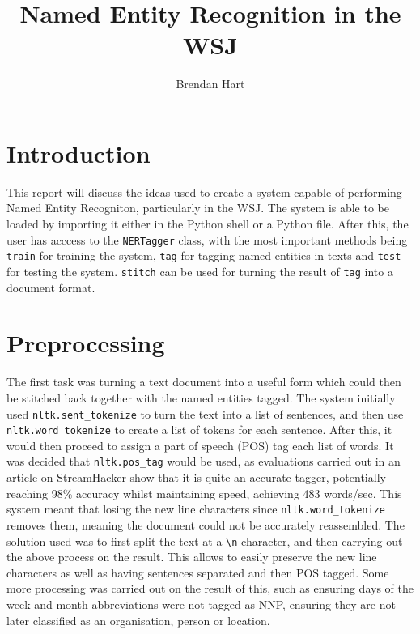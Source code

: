 \documentclass[10pt]{article}
\title{Named Entity Recognition in the WSJ}
\author{Brendan Hart}
\begin{document}
\maketitle

\begin{multicols}{2}

\section{Introduction}
This report will discuss the ideas used to create a system capable of performing Named Entity Recogniton, particularly in the WSJ. The system is able to be loaded by importing it either in the Python shell or a Python file. After this, the user has acccess to the {{\tt NERTagger}} class, with the most important methods being {{\tt train}} for training the system,
{{\tt tag}} for tagging named entities in texts and {{\tt test}} for testing the system. {{\tt stitch}} can be used for turning the result of {{\tt tag}} into a document format.

\section{Preprocessing}
The first task was turning a text document into a useful form which could then be stitched back together with the named entities tagged. The system initially used {{\tt nltk.sent\_tokenize}}\cite{tokenize} to turn the text into a list of sentences, and then use {{\tt nltk.word\_tokenize}}\cite{tokenize} to create a list of tokens for each sentence. After this, it would then proceed to assign a part of speech (POS) tag each list of words. It was decided that {{\tt nltk.pos\_tag}} would be used, as evaluations carried out in an article on StreamHacker show that it is quite an accurate tagger, potentially reaching 98\% accuracy whilst maintaining speed, achieving 483 words/sec\cite{postagcomp}. This system meant that losing the new line characters since {{\tt nltk.word\_tokenize}} removes them, meaning the document could not be accurately reassembled. The solution used was to first split the text at a {{\tt \textbackslash n}} character, and then carrying out the above process on the result. This allows to easily preserve the new line characters as well as having sentences separated and then POS tagged. Some more processing was carried out on the result of this, such as ensuring days of the week and month abbreviations were not tagged as NNP, ensuring they are not later classified as an organisation, person or location.


\end{multicols}
\end{document}
